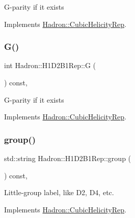 G-\/parity if it exists 

Implements \mbox{\hyperlink{structHadron_1_1CubicHelicityRep_a50689f42be1e6170aa8cf6ad0597018b}{Hadron\+::\+Cubic\+Helicity\+Rep}}.

\mbox{\label{structHadron_1_1H1D2B1Rep_aa63b64ca5dfe557c9ea319ed68580acd}} 
\subsubsection{\texorpdfstring{G()}{G()}\hspace{0.1cm}{\footnotesize\ttfamily [2/2]}}
{\footnotesize\ttfamily int Hadron\+::\+H1\+D2\+B1\+Rep\+::G (\begin{DoxyParamCaption}{ }\end{DoxyParamCaption}) const\hspace{0.3cm}{\ttfamily [inline]}, {\ttfamily [virtual]}}

G-\/parity if it exists 

Implements \mbox{\hyperlink{structHadron_1_1CubicHelicityRep_a50689f42be1e6170aa8cf6ad0597018b}{Hadron\+::\+Cubic\+Helicity\+Rep}}.

\mbox{\label{structHadron_1_1H1D2B1Rep_a18b7522e1d6bfeeb4abf011f7e6def9a}} 
\subsubsection{\texorpdfstring{group()}{group()}\hspace{0.1cm}{\footnotesize\ttfamily [1/3]}}
{\footnotesize\ttfamily std\+::string Hadron\+::\+H1\+D2\+B1\+Rep\+::group (\begin{DoxyParamCaption}{ }\end{DoxyParamCaption}) const\hspace{0.3cm}{\ttfamily [inline]}, {\ttfamily [virtual]}}

Little-\/group label, like D2, D4, etc. 

Implements \mbox{\hyperlink{structHadron_1_1CubicHelicityRep_a101a7d76cd8ccdad0f272db44b766113}{Hadron\+::\+Cubic\+Helicity\+Rep}}.

\mbox{\label{structHadron_1_1H1D2B1Rep_a18b7522e1d6bfeeb4abf011f7e6def9a}} 
